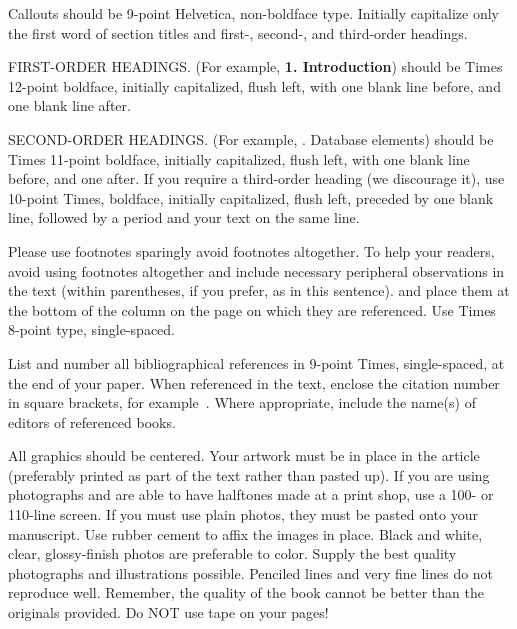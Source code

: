 \documentclass[times, 10pt,twocolumn]{article}
\begin{document}
\noindent Callouts should be 9-point Helvetica, non-boldface type.
Initially capitalize only the first word of section titles and first-,
second-, and third-order headings.

FIRST-ORDER HEADINGS. (For example, {\large \bf 1.  Introduction}) should
be Times 12-point boldface, initially capitalized, flush left, with one
blank line before, and one blank line after.

SECOND-ORDER HEADINGS. (For example, {. Database elements})
should be Times 11-point boldface, initially capitalized, flush left, with
one blank line before, and one after. If you require a third-order heading
(we discourage it), use 10-point Times, boldface, initially capitalized,
flush left, preceded by one blank line, followed by a period and your text
on the same line.


Please use footnotes sparingly%
	avoid footnotes altogether.  To help your readers, avoid using footnotes
	altogether and include necessary peripheral observations in the text
	(within parentheses, if you prefer, as in this sentence). and place them
	at the bottom of the column on the page on which they are referenced.
	Use Times 8-point type, single-spaced.



List and number all bibliographical references in 9-point Times,
single-spaced, at the end of your paper. When referenced in the text,
enclose the citation number in square brackets, for example~\cite{ex1}.
Where appropriate, include the name(s) of editors of referenced books.


All graphics should be centered. Your artwork must be in place in the
article (preferably printed as part of the text rather than pasted up).
If you are using photographs and are able to have halftones made at a
print shop, use a 100- or 110-line screen. If you must use plain photos,
they must be pasted onto your manuscript. Use rubber cement to affix the
images in place. Black and white, clear, glossy-finish photos are
preferable to color. Supply the best quality photographs and illustrations
possible. Penciled lines and very fine lines do not reproduce well.
Remember, the quality of the book cannot be better than the originals
provided. Do NOT use tape on your pages!
\end{document}
